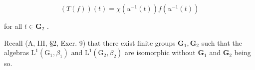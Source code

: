 \[
(T (f)) (t) = \chi (u ^ {- 1} (t)) f (u ^ {- 1} (t))
\]

for all \(t \in \mathbf{G}_2\) .

Recall (A, III, §2, Exer. 9) that there exist finite groups \(\mathbf{G}_1, \mathbf{G}_2\) such that the algebras \(\mathrm{L}^1(\mathrm{G}_1, \beta_1)\) and \(\mathrm{L}^1(\mathrm{G}_2, \beta_2)\) are isomorphic without \(\mathbf{G}_1\) and \(\mathbf{G}_2\) being so.


